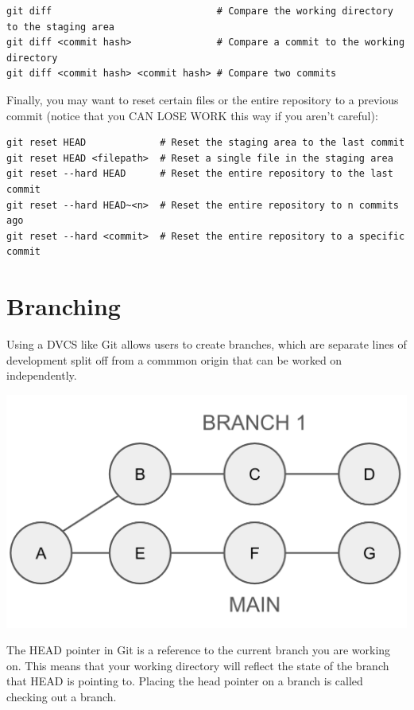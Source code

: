 \documentclass[fleqn]{article}
\begin{document}
\begin{lstlisting}
git diff                             # Compare the working directory to the staging area
git diff <commit hash>               # Compare a commit to the working directory
git diff <commit hash> <commit hash> # Compare two commits
\end{lstlisting}

Finally, you may want to reset certain files or the entire repository to a
previous commit (notice that you CAN LOSE WORK this way if you aren't careful):

\begin{lstlisting}
git reset HEAD             # Reset the staging area to the last commit
git reset HEAD <filepath>  # Reset a single file in the staging area
git reset --hard HEAD      # Reset the entire repository to the last commit
git reset --hard HEAD~<n>  # Reset the entire repository to n commits ago
git reset --hard <commit>  # Reset the entire repository to a specific commit
\end{lstlisting}

\pagebreak

\section*{Branching}

Using a DVCS like Git allows users to create branches, which are separate
lines of development split off from a commmon origin that can be worked on
independently. 

\begin{center}
    \includegraphics[scale=0.3]{branch.png}
\end{center}

The HEAD pointer in Git is a reference to the current branch you are working on.
This means that your working directory will reflect the state of the branch
that HEAD is pointing to. Placing the head pointer on a branch is called
checking out a branch.
\end{document}
